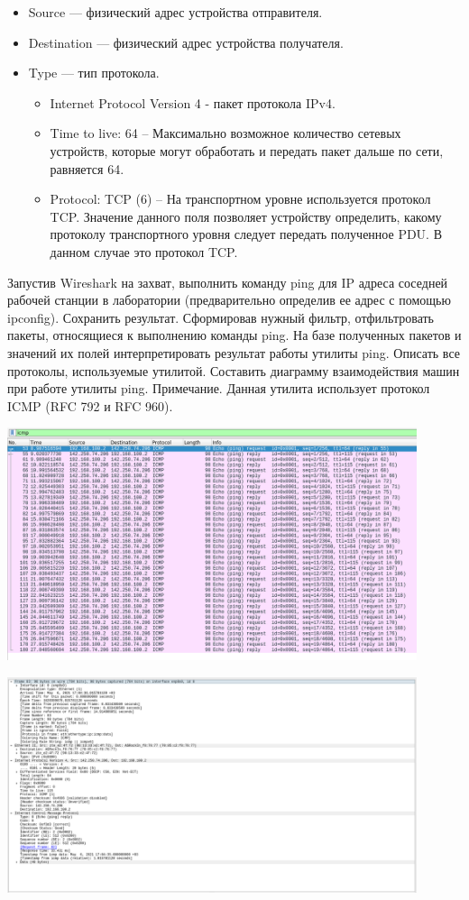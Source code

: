 \begin{itemize}
    \scriptsize
    \item Source --- физический адрес устройства отправителя.
    \item Destination --- физический адрес устройства получателя.
    \item Type --- тип протокола.
    \begin{itemize}
        \item Internet Protocol Version 4 - пакет протокола IPv4.
        \item Time to live: 64 – Максимально возможное количество сетевых устройств, которые могут обработать и передать пакет дальше по сети, равняется 64.
        \item Protocol: TCP (6) – На транспортном уровне используется протокол TCP.
        Значение данного поля позволяет устройству определить, какому протоколу транспортного уровня следует передать полученное PDU.
        В данном случае это протокол TCP.
    \end{itemize}
\end{itemize}

Запустив Wireshark на захват, выполнить команду ping для IP адреса соседней рабочей станции в лаборатории (предварительно определив ее адрес с помощью ipconfig).
Сохранить результат.
Сформировав нужный фильтр, отфильтровать пакеты, относящиеся к выполнению команды ping.
На базе полученных пакетов и значений их полей интерпретировать результат работы утилиты ping.
Описать все протоколы, используемые утилитой.
Составить диаграмму взаимодействия машин при работе утилиты ping.
Примечание.
Данная утилита использует протокол ICMP (RFC 792 и RFC 960).

\includegraphics[width=0.9\textwidth]{resources/filterIcmp}

\includegraphics[width=0.9\textwidth]{resources/ping}

